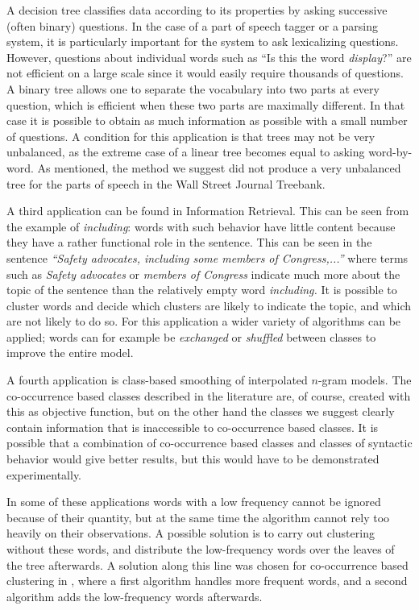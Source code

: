 A decision tree classifies data according to its properties by asking successive
(often binary) questions.  In the case of a part of speech tagger or a parsing
system, it is particularly important for the system to ask lexicalizing
questions.  However, questions about individual words such as ``Is this the word
{\em display}?'' are not efficient on a large scale since it would easily
require thousands of questions. A binary tree allows one to separate the
vocabulary into two parts at every question, which is efficient when these two
parts are maximally different.  In that case it is possible to obtain as much
information as possible with a small number of questions.  A condition for this
application is that trees may not be very unbalanced, as the extreme case of a
linear tree becomes equal to asking word-by-word. As mentioned, the method we
suggest did not produce a very unbalanced tree for the parts of speech in the
Wall Street Journal Treebank.

A third application can be found in Information Retrieval. This can be seen from
the example of {\em including}: words with such behavior have little content
because they have a rather functional role in the sentence. This can be seen in
the sentence {\em ``Safety advocates, including some members of Congress,...''}
where terms such as {\em Safety advocates} or {\em members of Congress} indicate
much more about the topic of the sentence than the relatively empty word
{\em including.} It is possible to cluster words and decide which clusters are
likely to indicate the topic, and which are not likely to do so.  For this
application a wider variety of algorithms can be applied; words can for example
be {\em exchanged} or {\em shuffled} between classes to improve the entire
model.

A fourth application is class-based smoothing of interpolated $n$-gram models.
The co-occurrence based classes described in the literature are, of course,
created with this as objective function, but on the other hand the classes we
suggest clearly contain information that is inaccessible to co-occurrence based
classes. It is possible that a combination of co-occurrence based classes and
classes of syntactic behavior would give better results, but this would have
to be demonstrated experimentally.

In some of these applications words with a low frequency cannot be ignored
because of their quantity, but at the same time the algorithm cannot rely too
heavily on their observations. A possible solution is to carry out clustering
without these words, and distribute the low-frequency words over the leaves of
the tree afterwards. A solution along this line was chosen for co-occurrence
based clustering in \cite{mcmahon96}, where a first algorithm handles more
frequent words, and a second algorithm adds the low-frequency words afterwards.

